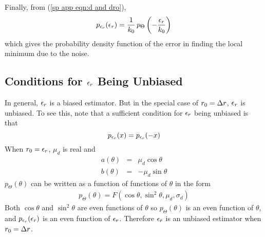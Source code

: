 Finally, from (\ref{sp app eqn:d and dro}), 
\begin{equation}
p_{\epsilon_r}(\epsilon_r)=\frac{1}{k_0}\,p_{\Theta}\left(-\frac{\epsilon_r}{k_0}\right)
\end{equation}
which gives the probability density function of the error in finding the
local minimum due to the noise.

\subsection{Conditions for $\epsilon_r$ Being Unbiased}

In general, $\epsilon_r$ is a biased estimator.  But in the special case of
${r_0}={\Delta r}$, $\epsilon_r$ is unbiased.  To see this, note that a sufficient 
condition for $\epsilon_r$ being unbiased is that 
\begin{equation}
p_{\epsilon_r}(x)=p_{\epsilon_r}(-x)
\end{equation}
When ${r_0}=\epsilon_r$, $\mu_d$ is real and
\begin{eqnarray}
a(\theta)&=&\mu_d\cos\theta\\
b(\theta)&=&-\mu_d\sin\theta
\end{eqnarray}
$p_{\Theta}(\theta)$ can be written as a function of functions of $\theta$
in the form
\begin{eqnarray}
p_{\Theta}(\theta)=F\left(\cos\theta,\sin^2\theta,\mu_d,\sigma_d\right)
\end{eqnarray}
Both $\cos\theta$ and $\sin^2\theta$ are even functions of $\theta$ so
$p_{\Theta}(\theta)$ is an even function of $\theta$, and
$p_{\epsilon_r}(\epsilon_r)$ is an even function of $\epsilon_r$.  Therefore $\epsilon_r$ is an
unbiased estimator when ${r_0}={\Delta r}$.

\label{sp app:Gaussians}

\begingroup
\def\np{{w}}				%
\def\na{{w_1}}				%
\def\nb{{w_2}}				%
\def\nv{{\sigma^2}}			%
\def\ni#1{{\sigma^{#1}}}		%
\def\nsd{{\sigma}}			%
\def\e#1{{e^{#1}}}			%
\def\conj#1{\overline{#1}}		%
\def\pr{{p}}		    		%
\def\conv{{\,\star\,}}			%
\def\E#1{{\mathop{\rm E}\nolimits\left\{#1\right\}}}	 %
\def\Var#1{{\mathop{\rm Var}\nolimits\left\{#1\right\}}} %
\def\Ko#1{{\mathop{\rm K_0}\nolimits\left(#1\right)}} %


